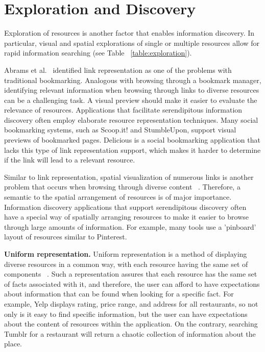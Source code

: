 {\section{Exploration and Discovery}
Exploration of resources is another factor that enables information discovery. In particular, visual and spatial explorations of single or multiple resources allow for rapid information searching (see Table ~\ref{table:exploration}). 

Abrams et al.~\cite{abrams} identified link representation as one of the problems with traditional bookmarking. Analogous with browsing through a bookmark manager, identifying relevant information when browsing through links to diverse resources can be a challenging task. A visual preview should make it easier to evaluate the relevance of resources. Applications that facilitate serendipitous information discovery often employ elaborate resource representation techniques. Many social bookmarking systems, such as Scoop.it! and StumbleUpon, support visual previews of bookmarked pages. Delicious is a social bookmarking application that lacks this type of link representation support, which makes it harder to determine if the link will lead to a relevant resource.

Similar to link representation, spatial visualization of numerous links is another problem that occurs when browsing through diverse content ~\cite{abrams}. Therefore, a semantic to the spatial arrangement of resources is of major importance. Information discovery applications that support serendipitous discovery often have a special way of spatially arranging resources to make it easier to browse through large amounts of information. For example, many tools use a 'pinboard' layout of resources similar to Pinterest.

\textbf{Uniform representation.} Uniform representation is a method of displaying diverse resources in a common way, with each resource having the same set of components ~\cite{herrera}. Such a representation assures that each resource has the same set of facts associated with it, and therefore, the user can afford to have expectations about information that can be found when looking for a specific fact. For example, Yelp displays rating, price range, and address for all restaurants, so not only is it easy to find specific information, but the user can have expectations about the content of resources within the application. On the contrary, searching Tumblr for a restaurant will return a chaotic collection of information about the place. 



}
